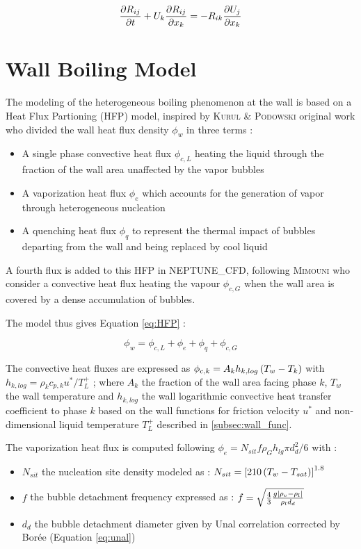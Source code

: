 \begin{equation}
\frac{\partial{R_{ij}}}{\partial t} + U_{k}\frac{\partial R_{ij}}{\partial x_{k}} = - R_{ik} \frac{\partial U_{j}}{\partial x_{k}}
\end{equation}


\section{Wall Boiling Model}
\label{subsec:HFP}

The modeling of the heterogeneous boiling phenomenon at the wall is based on a Heat Flux Partioning (HFP) model, inspired by \textsc{Kurul} \& \textsc{Podowski} original work\cite{Kurul1990} who divided the wall heat flux density $\phi_{w}$ in three terms  :

\begin{itemize}
\item A single phase convective heat flux $\phi_{c,L}$ heating the liquid through the fraction of the wall area unaffected by the vapor bubbles
\item A vaporization heat flux $\phi_{e}$ which accounts for the generation of vapor through heterogeneous nucleation
\item A quenching heat flux $\phi_{q}$ to represent the thermal impact of bubbles departing from the wall and being replaced by cool liquid
\end{itemize}

A fourth flux is added to this HFP in NEPTUNE\_CFD, following \textsc{Mimouni} \etal\cite{Mimouni2016} who consider a convective heat flux heating the vapour $\phi_{c,G}$ when the wall area is covered by a dense accumulation of bubbles.

The model thus gives Equation \ref{eq:HFP} :

\begin{equation}
\label{eq:HFP}
\phi_{w}=\phi_{c,L}+\phi_{e}+\phi_{q}+\phi_{c,G}
\end{equation}

The convective heat fluxes are expressed as $\phi_{c,k}=A_{k}h_{k,log}\left( T_{w}-T_{k} \right)$ with $ h_{k,log}=\rho_{k}c_{p,k}{u^{*}}/{T_{L}^{+}}$ ; where $A_{k}$ the fraction of the wall area facing phase $k$, $T_{w}$ the wall temperature and $h_{k,log}$ the wall logarithmic convective heat transfer coefficient to phase $k$ based on the wall functions for friction velocity $u^{*}$ and non-dimensional liquid temperature $T_{L}^{+}$ described in \ref{subsec:wall_func}.

The vaporization heat flux is computed following $\phi_{e}=N_{sit}f\rho_{G}h_{lg}{\pi d_{d}^{2}}/{6}$ with :
\begin{itemize}
\item $N_{sit}$ the nucleation site density modeled as \cite{Lemmert1977} : $N_{sit}=\left[ 210\left( T_{w}-T_{sat} \right)  \right]^{1.8}$
\item $f$ the bubble detachment frequency expressed as \cite{Cole1960} : $f=\sqrt{\frac{4}{3}\frac{g\left| \rho_{v}-\rho_{l} \right| }{\rho_{l}d_{d}}}$
\item $d_{d}$ the bubble detachment diameter given by Unal correlation\cite{Unal1976} corrected by Bor\'ee \etal[ref] (Equation \ref{eq:unal})
\end{itemize}

